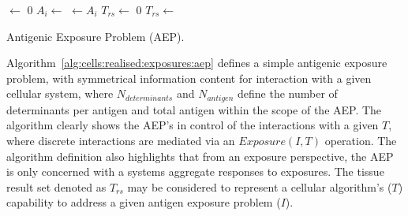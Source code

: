 \begin{algorithm}[ht]	
	\SetLine
	
	
	
	
	\Infection $\leftarrow$ 0\;
  {
  	$A_i \leftarrow$ \; 
  	\Infection $\leftarrow A_i$\;
  }  
  $T_{rs} \leftarrow$ 0\;
	\While{$\neg$\StopCondition{}}
	{
		$T_{rs} \leftarrow$ \Exposure{\Infection, \Tissue}\;
	} 
	\;
	\caption{Antigenic Exposure Problem (AEP).}
	\label{alg:cells:realised:exposures:aep}
\end{algorithm}

Algorithm~\ref{alg:cells:realised:exposures:aep} defines a simple antigenic exposure problem, with symmetrical information content for interaction with a given cellular system, where $N_{determinants}$ and $N_{antigen}$ define the number of determinants per antigen and total antigen within the scope of the AEP. The algorithm clearly shows the AEP's in control of the interactions with a given $T$, where discrete interactions are mediated via an $Exposure(I,T)$ operation. The algorithm definition also highlights that from an exposure perspective, the AEP is only concerned with a systems aggregate responses to exposures. The tissue result set denoted as $T_{rs}$ may be considered to represent a cellular algorithm's ($T$) capability to address a given antigen exposure problem ($I$).

%
%
